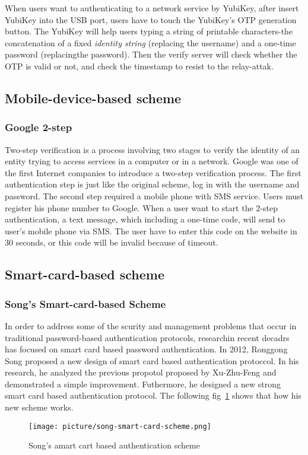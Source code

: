 \begin{CJK}{Bg5}{bsmi}
When users want to authenticating to a network service by YubiKey, after insert YubiKey into the USB port, users have to touch the YubiKey's OTP generation button. The YubiKey will help users typing a string of printable characters-the concatenation of a fixed \emph{identity string} (replacing the username) and a one-time password (replacingthe password). Then the verify server will check whether the OTP is valid or not, and check the timestamp to resist to the relay-attak.

\subsection{Mobile-device-based scheme}

\subsubsection{Google 2-step}

Two-step verification is a process involving two stages to verify the identity of an entity trying to access services in a computer or in a network. Google was one of the first Internet companies to introduce a two-step verification process\cite{google-2-step}. The first authentication step is just like the original scheme, log in with the username and password. The second step required a mobile phone with SMS service. Users must register his phone number to Google. When a user want to start the 2-step authentication, a text message, which including a one-time code, will send to user's mobile phone via SMS. The user have to enter this code on the website in 30 seconds, or this code will be invalid because of timeout.

\subsection{Smart-card-based scheme}

\subsubsection{Song's Smart-card-based Scheme}

In order to address some of the scurity and management problems that occur in traditional password-based authentication protocols, researchin recent decadrs has focused on smart card based password authentication. In 2012, Ronggong Song proposed a new design of smart card based authentication protoccol\cite{smart-card}. In his research, he analyzed the previous propotol proposed by Xu-Zhu-Feng and demonstrated a simple improvement. Futhermore, he designed a new strong smart card based authentication protocol. The following fig~\ref{fig:song-smard-card-scheme} shows that how his new scheme works.

\begin{figure}
\centering
\texttt{[image: picture/song-smart-card-scheme.png]}
\caption{Song's amart cart based authentication scheme}
\label{fig:song-smard-card-scheme}
\end{figure}
\end{CJK}